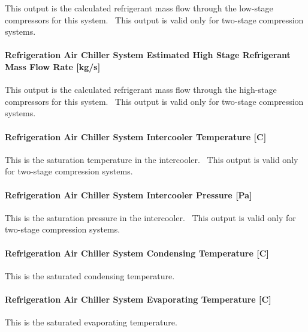 This output is the calculated refrigerant mass flow through the low-stage compressors for this system.~ This output is valid only for two-stage compression systems.

\paragraph{Refrigeration Air Chiller System Estimated High Stage Refrigerant Mass Flow Rate {[}kg/s{]}}\label{refrigeration-air-chiller-system-estimated-high-stage-refrigerant-mass-flow-rate-kgs}

This output is the calculated refrigerant mass flow through the high-stage compressors for this system.~ This output is valid only for two-stage compression systems.

\paragraph{Refrigeration Air Chiller System Intercooler Temperature {[}C{]}}\label{refrigeration-air-chiller-system-intercooler-temperature-c}

This is the saturation temperature in the intercooler.~ This output is valid only for two-stage compression systems.

\paragraph{Refrigeration Air Chiller System Intercooler Pressure {[}Pa{]}}\label{refrigeration-air-chiller-system-intercooler-pressure-pa}

This is the saturation pressure in the intercooler.~ This output is valid only for two-stage compression systems.

\paragraph{Refrigeration Air Chiller System Condensing Temperature {[}C{]}}\label{refrigeration-air-chiller-system-condensing-temperature-c}

This is the saturated condensing temperature.

\paragraph{Refrigeration Air Chiller System Evaporating Temperature {[}C{]}}\label{refrigeration-air-chiller-system-evaporating-temperature-c}

This is the saturated evaporating temperature.

